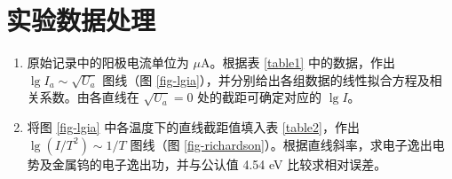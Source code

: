 \documentclass{../template/myrpt}
\begin{document}
\section{实验数据处理}
\begin{enumerate}
  \item 原始记录中的阳极电流单位为 $\mu$A。根据表 \ref{table1} 中的数据，作出 $\lg I_a \sim \sqrt{U_a}$ 图线（图 \ref{fig-lgia}），并分别给出各组数据的线性拟合方程及相关系数。由各直线在 $\sqrt{U_a}=0$ 处的截距可确定对应的 $\lg I$。
  \item 将图 \ref{fig-lgia} 中各温度下的直线截距值填入表 \ref{table2}，作出 $\lg (I/T^2) \sim 1/T$ 图线（图 \ref{fig-richardson}）。根据直线斜率，求电子逸出电势及金属钨的电子逸出功，并与公认值 4.54 eV 比较求相对误差。
\end{enumerate}
\end{document}
